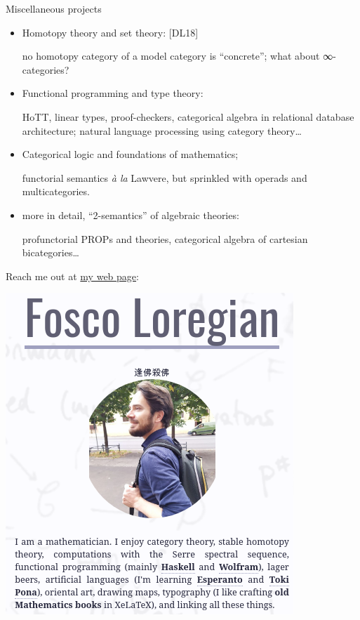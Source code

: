 \documentclass[handout]{beamer}
\def\lnk#1{\href{#1}{\faFilePdfO}}
\begin{document}
\begin{frame}{Miscellaneous projects}
\small
\begin{itemize}
  \item<+-> Homotopy theory and set theory: [\alert{DL18}\lnk{https://link.springer.com/article/10.1007/s40062-018-0197-3}]

  {\color{gray!70}\footnotesize  no homotopy category of a model category is ``concrete''; what about ∞-categories?}
  \item<+-> Functional programming and type theory:

  {\color{gray!70}\footnotesize  HoTT, linear types, proof-checkers, categorical algebra in relational database architecture; natural language processing using category theory\dots}
  \item<+-> Categorical logic and foundations of mathematics;

  {\color{gray!70}\footnotesize  functorial semantics \emph{à la} Lawvere, but sprinkled with operads and multicategories.}
  \item<+-> more in detail, ``2-semantics'' of algebraic theories:

  {\color{gray!70}\footnotesize profunctorial PROPs and theories, categorical algebra of cartesian bicategories\dots}
\end{itemize}
\end{frame}
%
\begin{frame}
Reach me out at \href{http://tetrapharmakon.github.io}{my web page}:
\begin{center}
\href{http://tetrapharmakon.github.io}{
\includegraphics[width=.2\textwidth]{crop1.png}
}
\end{center}
\end{frame}
%
%
%
%
%
\end{document}
